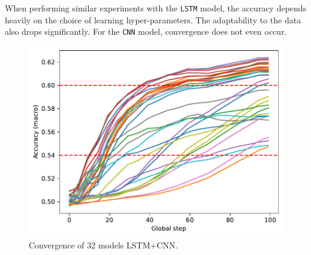 \documentclass[aps,prb,groupedaddress,twocolumn,showpacs,dvipdfmx,superscriptaddress,pdftex]{revtex4-2}
\begin{document}
\vspace{2mm}


When performing similar experiments with the \verb|LSTM| model, the accuracy depends heavily on the choice of learning hyper-parameters. The adaptability to the data also drops significantly. For the \verb|CNN| model, convergence does not even occur.

\begin{figure}[h]
    \centering
    \includegraphics[width=\linewidth]{img/lr.pdf}
    \caption{Convergence of 32 models LSTM+CNN.}
    \label{fig:lr}
\end{figure}

\vspace{2mm}

\end{document}
